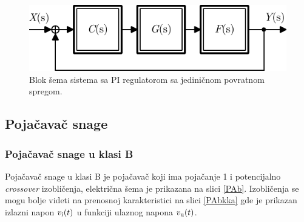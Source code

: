 \documentclass[a4paper, 12pt, diplomski]{etf}
\begin{document}
\begin{figure}[h!]
    \centering
    \includegraphics[scale=1]{fig/nps2.pdf}
    \caption{Blok šema sistema sa PI regulatorom sa jediničnom povratnom spregom.}
    \label{nps2}
\end{figure}


\subsection{Pojačavač snage}
\subsubsection{Pojačavač snage u klasi B} \label{s:PAB}

Pojačavač snage u klasi B je pojačavač koji ima pojačanje 1 i potencijalno \textit{crossover} izobličenja, električna šema je prikazana na slici \ref{PAb}. Izobličenja se mogu bolje videti na prenosnoj karakteristici na slici \ref{PAbkka} gde je prikazan izlazni napon $v_{\rm i}(t)$ u funkciji ulaznog napona $v_{\rm u}(t)$.
\end{document}
